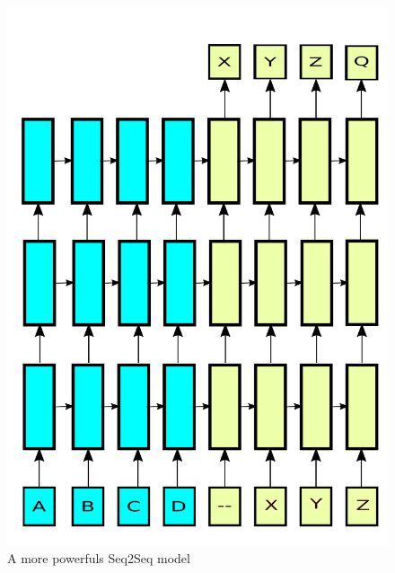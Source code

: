 \documentclass[conference]{IEEEtran}
\begin{document}
 \begin{figure}
  \centering
      \includegraphics[width=.49\linewidth]{img/seq2seq_deep.pdf} 
	\caption{A more powerfuls Seq2Seq model}
	\label{fig:seqdeep}
\end{figure}
\end{document}
